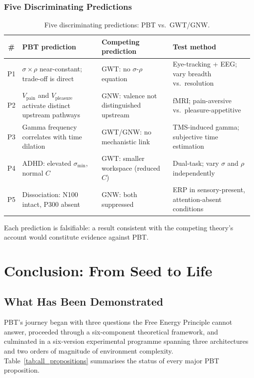 \documentclass[12pt,a4paper]{article}
\newcommand{\vpain}{V_{\mathrm{pain}}}
\newcommand{\vpleasure}{V_{\mathrm{pleasure}}}
\begin{document}
\subsubsection{Five Discriminating Predictions}

\begin{table}[ht]
\centering
\caption{Five discriminating predictions: PBT vs.\ GWT/GNW.}
\label{tab:discrim}
\small
\begin{tabular}{@{}cL{3.0cm}L{3.0cm}L{4.5cm}@{}}
\toprule
\textbf{\#} & \textbf{PBT prediction}
  & \textbf{Competing prediction} & \textbf{Test method} \\
\midrule
P1 & $\sigma\!\times\!\rho$ near-constant; trade-off is direct &
  GWT: no $\sigma$-$\rho$ equation &
  Eye-tracking + EEG; vary breadth vs.\ resolution \\
P2 & $\vpain$ and $\vpleasure$ activate distinct upstream pathways &
  GNW: valence not distinguished upstream &
  fMRI; pain-aversive vs.\ pleasure-appetitive \\
P3 & Gamma frequency correlates with time dilation &
  GWT/GNW: no mechanistic link &
  TMS-induced gamma; subjective time estimation \\
P4 & ADHD: elevated $\sigma_{\min}$, normal $C$ &
  GWT: smaller workspace (reduced $C$) &
  Dual-task; vary $\sigma$ and $\rho$ independently \\
P5 & Dissociation: N100 intact, P300 absent &
  GNW: both suppressed &
  ERP in sensory-present, attention-absent conditions \\
\bottomrule
\end{tabular}
\end{table}

Each prediction is falsifiable: a result consistent with the competing theory's
account would constitute evidence against PBT.

\section{Conclusion: From Seed to Life}
\label{sec:conclusion}

\subsection{What Has Been Demonstrated}

PBT's journey began with three questions the Free Energy Principle cannot
answer, proceeded through a six-component theoretical framework, and culminated
in a six-version experimental programme spanning three architectures and two
orders of magnitude of environment complexity. Table~\ref{tab:all_propositions}
summarises the status of every major PBT proposition.
\end{document}
